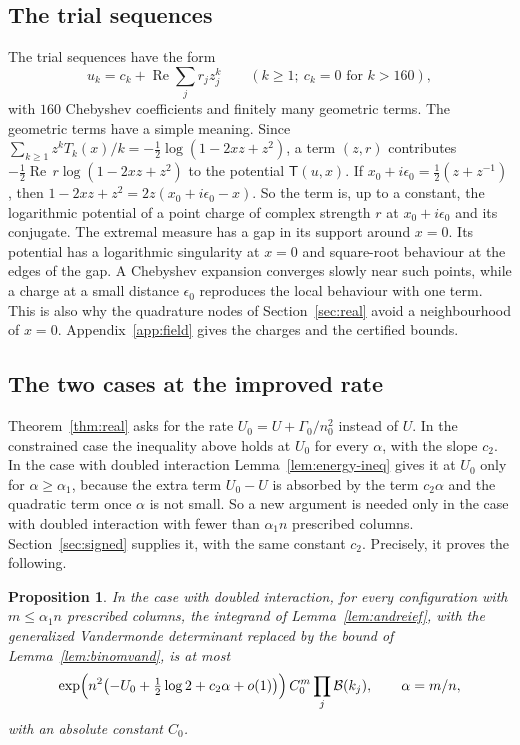 \documentclass[11pt]{amsart}
\newcommand{\Kcoef}{160}
\newtheorem{proposition}[theorem]{Proposition}
\theoremstyle{definition}
\theoremstyle{remark}
\numberwithin{equation}{section}
\begin{document}
\subsection{The trial sequences}\label{ssec:trials}
The trial sequences have the form
\begin{equation}\label{eq:trial}
 u_k=c_k+\operatorname{Re}\sum_jr_jz_j^k\qquad(k\ge1;\ c_k=0\text{ for }k>\Kcoef),
\end{equation}
with $\Kcoef$ Chebyshev coefficients and finitely many geometric terms. The geometric terms have a simple
meaning. Since $\sum_{k\ge1}z^kT_k(x)/k=-\frac12\log(1-2xz+z^2)$, a term $(z,r)$ contributes
$-\frac12\operatorname{Re}\,r\log(1-2xz+z^2)$ to the potential $\mathsf T(u,x)$. If
$x_0+i\epsilon_0=\frac12(z+z^{-1})$, then $1-2xz+z^2=2z(x_0+i\epsilon_0-x)$. So the term is, up to a constant,
the logarithmic potential of a point charge of complex strength $r$ at $x_0+i\epsilon_0$ and its conjugate. The
extremal measure has a gap in its support around $x=0$. Its potential has a logarithmic singularity at $x=0$
and square-root behaviour at the edges of the gap. A Chebyshev expansion converges slowly near such points,
while a charge at a small distance $\epsilon_0$ reproduces the local behaviour with one term. This is also why
the quadrature nodes of Section~\ref{sec:real} avoid a neighbourhood of $x=0$. Appendix~\ref{app:field} gives the charges
and the certified bounds.

\subsection{The two cases at the improved rate}\label{ssec:cases}
Theorem~\ref{thm:real} asks for the rate $U_0=U+\Gamma_0/n_0^2$ instead of $U$. In the constrained case the
inequality above holds at $U_0$ for every $\alpha$, with the slope $c_2$. In the case with doubled interaction
Lemma~\ref{lem:energy-ineq} gives it at $U_0$ only for $\alpha\ge\alpha_1$, because the extra term $U_0-U$ is
absorbed by the term $c_2\alpha$ and the quadratic term once $\alpha$ is not small. So a new argument is needed
only in the case with doubled interaction with fewer than $\alpha_1n$ prescribed columns.
Section~\ref{sec:signed} supplies it, with the same constant $c_2$. Precisely, it proves the following.

\begin{proposition}\label{prop:signed-goal}
In the case with doubled interaction, for every configuration with $m\le\alpha_1n$ prescribed columns, the
integrand of Lemma~\ref{lem:andreief}, with the generalized Vandermonde determinant replaced by the bound of
Lemma~\ref{lem:binomvand}, is at most
\[
 \exp\Bigl(n^2\bigl(-U_0+\tfrac12\log2+c_2\alpha+o(1)\bigr)\Bigr)\,C_0^m\prod_j\mathcal B(k_j),\qquad \alpha=m/n,
\]
with an absolute constant $C_0$.
\end{proposition}
\end{document}
